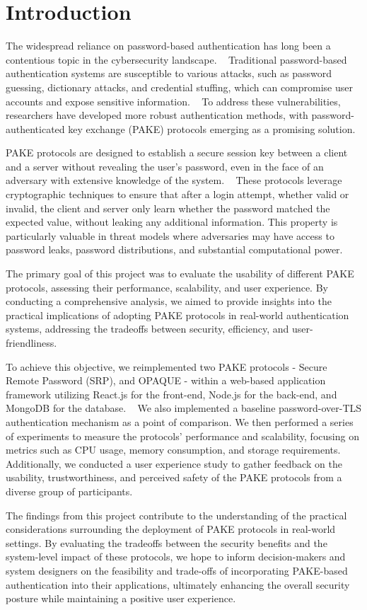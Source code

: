 \section{Introduction}
\label{sec:intro}

The widespread reliance on password-based authentication has long been a contentious topic in the cybersecurity landscape. ~\cite{taneski2014password,zviran1999password} Traditional password-based authentication systems are susceptible to various attacks, such as password guessing, dictionary attacks, and credential stuffing, which can compromise user accounts and expose sensitive information. ~\cite{booneau2012guessing, raza2012survey,jia2022analysis} To address these vulnerabilities, researchers have developed more robust authentication methods, with password-authenticated key exchange (PAKE) protocols emerging as a promising solution.

PAKE protocols are designed to establish a secure session key between a client and a server without revealing the user's password, even in the face of an adversary with extensive knowledge of the system. ~\cite{hao2022sokpake,gentry2006method} These protocols leverage cryptographic techniques to ensure that after a login attempt, whether valid or invalid, the client and server only learn whether the password matched the expected value, without leaking any additional information. This property is particularly valuable in threat models where adversaries may have access to password leaks, password distributions, and substantial computational power.

The primary goal of this project was to evaluate the usability of different PAKE protocols, assessing their performance, scalability, and user experience. By conducting a comprehensive analysis, we aimed to provide insights into the practical implications of adopting PAKE protocols in real-world authentication systems, addressing the tradeoffs between security, efficiency, and user-friendliness.

To achieve this objective, we reimplemented two PAKE protocols - Secure Remote Password (SRP), and OPAQUE - within a web-based application framework utilizing React.js for the front-end, Node.js for the back-end, and MongoDB for the database. ~\cite{wu1998srp, jarecki2018opaque, SRPrepo, OPAQUErepo} We also implemented a baseline password-over-TLS authentication mechanism as a point of comparison. We then performed a series of experiments to measure the protocols' performance and scalability, focusing on metrics such as CPU usage, memory consumption, and storage requirements. Additionally, we conducted a user experience study to gather feedback on the usability, trustworthiness, and perceived safety of the PAKE protocols from a diverse group of participants.

The findings from this project contribute to the understanding of the practical considerations surrounding the deployment of PAKE protocols in real-world settings. By evaluating the tradeoffs between the security benefits and the system-level impact of these protocols, we hope to inform decision-makers and system designers on the feasibility and trade-offs of incorporating PAKE-based authentication into their applications, ultimately enhancing the overall security posture while maintaining a positive user experience.